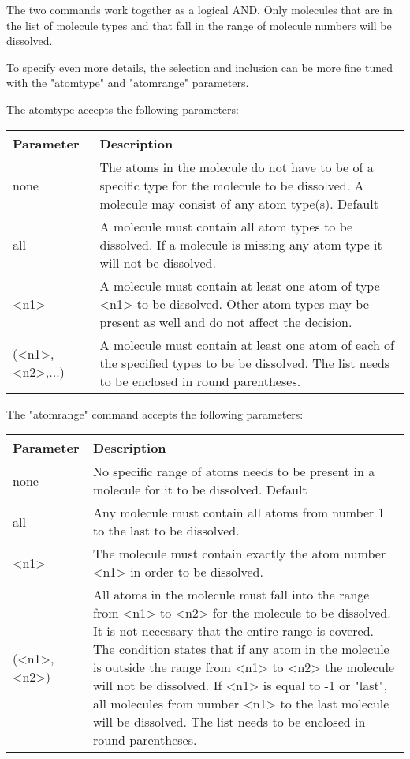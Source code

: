 The two commands work together as a logical AND. Only molecules that are in the
list of molecule types and that fall in the range of molecule numbers will be
dissolved.

To specify even more details, the selection and inclusion can be more fine tuned
with the "atomtype" and "atomrange" parameters.

The atomtype accepts the following parameters:

\begin{tabularx}{\textwidth}{|p{30mm}|X|}
  \hline
  {\bf Parameter} & {\bf Description} \\
  \hline\hline
  none    & The atoms in the molecule do not have to be of a specific type for
            the molecule to be dissolved. A molecule may consist of any atom 
            type(s). Default\\
  all     & A molecule must contain all atom types to be dissolved. If a 
            molecule is missing any atom type it will not be dissolved. \\
  <n1>    & A molecule must contain at least one atom of type <n1> to be 
            dissolved. Other atom types may be present as well and do not affect
            the decision. \\
  (<n1>,<n2>{,...})    & A molecule must contain at least one atom of each of 
                         the specified types to be be dissolved. The list needs
                         to be enclosed in round parentheses.\\
  \hline
\end{tabularx}

The "atomrange" command accepts the following parameters:

\begin{tabularx}{\textwidth}{|p{30mm}|X|}
  \hline
  {\bf Parameter} & {\bf Description} \\
  \hline\hline
  none    & No specific range of atoms needs to be present in a molecule for 
            it to be dissolved. Default\\
  all     & Any molecule must contain all atoms from number 1 to the last to be 
            dissolved. \\
  <n1>    & The molecule must contain exactly the atom number <n1> in order to 
            be dissolved.\\
  (<n1>,<n2>)    & All atoms in the molecule must fall into the range from <n1> 
                   to <n2> for the molecule to be dissolved. It is not necessary
                   that the entire range is covered. The condition states that 
                   if any atom in the molecule is outside the range from <n1> 
                   to <n2> the molecule will not be dissolved. If <n1> is equal 
                   to -1 or "last", all molecules from number <n1> to the 
                   last molecule will be dissolved. The list needs to be 
                   enclosed in round parentheses.\\
  \hline
\end{tabularx}

